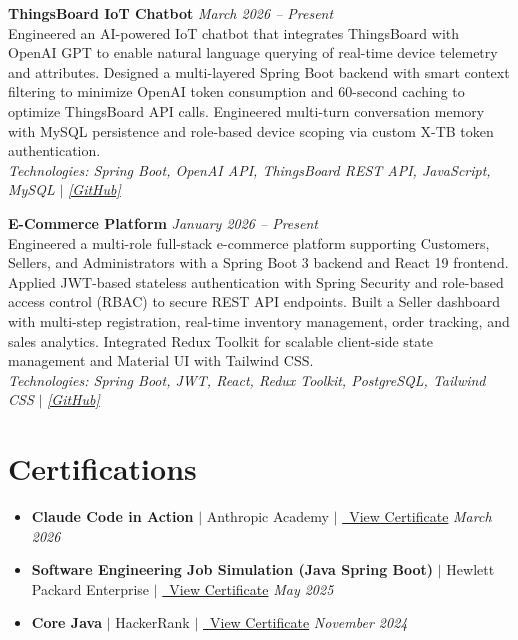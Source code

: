 \documentclass[10pt, a4paper]{article}
\begin{document}
\textbf{ThingsBoard IoT Chatbot} \hfill \textit{March 2026 -- Present} \\
\small Engineered an AI-powered IoT chatbot that integrates ThingsBoard with OpenAI GPT to enable natural language querying of real-time device telemetry and attributes. Designed a multi-layered Spring Boot backend with smart context filtering to minimize OpenAI token consumption and 60-second caching to optimize ThingsBoard API calls. Engineered multi-turn conversation memory with MySQL persistence and role-based device scoping via custom X-TB token authentication. \\
\small\textit{Technologies: Spring Boot, OpenAI API, ThingsBoard REST API, JavaScript, MySQL} $|$ \href{https://github.com/singhaganesh/ThingsBoard-Bot.git}{\textit{[GitHub]}}

\vspace{6pt}

\textbf{E-Commerce Platform} \hfill \textit{January 2026 -- Present} \\
\small Engineered a multi-role full-stack e-commerce platform supporting Customers, Sellers, and Administrators with a Spring Boot 3 backend and React 19 frontend. Applied JWT-based stateless authentication with Spring Security and role-based access control (RBAC) to secure REST API endpoints. Built a Seller dashboard with multi-step registration, real-time inventory management, order tracking, and sales analytics. Integrated Redux Toolkit for scalable client-side state management and Material UI with Tailwind CSS. \\
\small\textit{Technologies: Spring Boot, JWT, React, Redux Toolkit, PostgreSQL, Tailwind CSS} $|$ \href{https://github.com/singhaganesh/Ecommerce-Web.git}{\textit{[GitHub]}}


\section{Certifications}
\begin{itemize}[leftmargin=*, itemsep=4pt, topsep=2pt]
  \item \textbf{Claude Code in Action} $|$ Anthropic Academy $|$ \href{https://drive.google.com/file/d/10fWusr3B5y7uqHlejeYHJPfNI7hfHuqM/view?usp=sharing}{\faExternalLinkAlt\ View Certificate} \hfill \textit{March 2026}

  \item \textbf{Software Engineering Job Simulation (Java Spring Boot)} $|$ Hewlett Packard Enterprise $|$ \href{https://drive.google.com/file/d/1hGXeApV5uc2bW2ESBK71V4ilGfFzFotm/view}{\faExternalLinkAlt\ View Certificate} \hfill \textit{May 2025}

  \item \textbf{Core Java} $|$ HackerRank $|$ \href{https://drive.google.com/file/d/13JBQqnl3u7fpQG-NOGJxgJ3rv7yvUtII/view?usp=sharing}{\faExternalLinkAlt\ View Certificate} \hfill \textit{November 2024}
\end{itemize}
\end{document}
